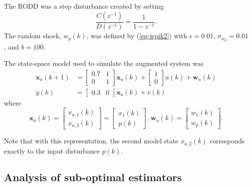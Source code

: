 The RODD was a step disturbance created by setting
\begin{equation}
	\frac{C(z^{-1})}{D(z^{-1})} = \frac{1}{1-z^{-1}}.
\end{equation}
The random shock, $w_p(k)$, was defined by (\ref{eq:wpik2}) with $\epsilon=0.01$, $\sigma_{w_p}=0.01$, and $b=100$.

The state-space model used to simulate the augmented system was
\begin{equation} \label{eq:sim-sys-siso-ss-aug}
	\begin{split}
	\mathbf{x}_{a}(k+1) & =\left[\begin{array}{cc}
		0.7 & 1 \\
		0 & 1
	\end{array}\right] \mathbf{x}_{a}(k)+\left[\begin{array}{l}
		1 \\
		0
	\end{array}\right] u(k) + \mathbf{w}_{a}(k) \\
	y(k) & =\left[\begin{array}{cc}
	0.3 & 0
\end{array}\right] \mathbf{x}_{a}(k) + v(k)
\end{split}
\end{equation}
where
\begin{equation} \label{eq:sim-sys-siso-ss-aug2}
		\mathbf{x}_{a}(k) = \left[\begin{array}{l}
			x_{a,1}(k) \\
			x_{a,2}(k)
		\end{array}\right] = \left[\begin{array}{l}
		x_{1}(k) \\
		p(k)
	\end{array}\right], \mathbf{w}_{a}(k) = \left[\begin{array}{l}
	w_1(k) \\
	w_{p}(k)
\end{array}\right] .
\end{equation}

Note that with this representation, the second model state $x_{a,2}(k)$ corresponds exactly to the input disturbance $p(k)$.

\subsection{Analysis of sub-optimal estimators} \label{sim-obs-lin-1-SKF-analysis}

